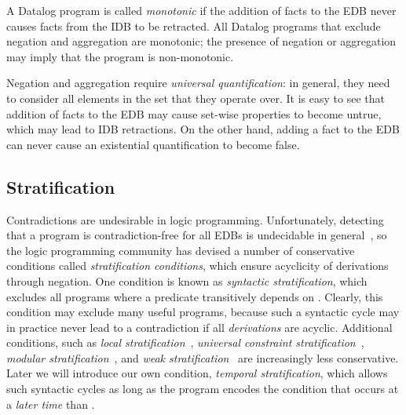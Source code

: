 A Datalog program is called {\em monotonic} if the addition of
facts to the EDB never causes facts from the IDB to be retracted.  All Datalog
programs that exclude negation and aggregation are monotonic; the presence of
negation or aggregation may imply that the program is non-monotonic.

Negation and aggregation require {\em universal
quantification}:
in general, they need to consider all elements in the
set that they operate over.  It is easy to see that addition of facts to the
EDB may cause set-wise properties to become untrue, which may lead to IDB
retractions.  On the other hand, adding a fact to the EDB can never cause an
existential quantification to become false.

\subsection{Stratification}

Contradictions are undesirable in logic programming. 
Unfortunately, detecting that a program is contradiction-free for all EDBs is
undecidable in general~\cite{papa-yanna}, so the logic programming community
has devised a number of conservative conditions called {\em stratification
conditions}, which ensure acyclicity of derivations through negation.  One
condition is known as {\em syntactic stratification}, which excludes all
programs where a predicate  transitively depends on
.  Clearly, this condition may exclude many useful
programs, because such a syntactic cycle may in practice never lead to a
contradiction if all {\em derivations} are acyclic.  Additional conditions,
such as {\em local stratification}~\cite{local-strat}, {\em universal
constraint stratification}~\cite{ross-syntactic}, {\em modular
stratification}~\cite{modular}, and {\em weak stratification}~\cite{weak-strat}
are increasingly less conservative.  Later we will introduce our own condition,
{\em temporal stratification}, which allows such syntactic cycles as long as
the program encodes the condition that  occurs at a {\em later time}
than .

